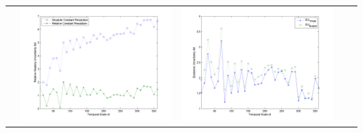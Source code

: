 \documentclass[11pt]{article}
\begin{document}
\begin{table}[H]
{\begin{tabular}{c  c   c   c  c }
&\begin{minipage}{.4\textwidth}\includegraphics[width=\linewidth]{resultgraph/07177500AU.png}\end{minipage}
&\begin{minipage}{.4\textwidth}\includegraphics[width=\linewidth]{resultgraph/07177500EU.png}\end{minipage}
\\


\end{tabular}}
\end{table}
\end{document}
